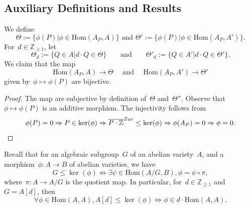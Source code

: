 \documentclass[12pt]{amsart}
\newcommand{\Hom}{\mbox{Hom}}
\newcommand{\Z}{{\mathbb Z}}
\newcommand{\ol}{\overline}
\begin{document}
\subsection{Auxiliary Definitions and Results}
We define
\[
\Theta:=\{\phi(P)|\phi\in \Hom(A_P,A)\}\text{ and }
\Theta':=\{\phi(P)|\phi\in \Hom(A_P,A')\}.
\]
For~$d\in\Z_{\geq1}$, let
\[
\Theta_d:=\{Q\in A|d\cdot Q\in \Theta\}\qquad\text{and}\qquad
\Theta'_d:=\{Q\in A'|d\cdot Q\in \Theta'\}.
\]
We claim that the map
\[
\Hom(A_P,A)\to \Theta\quad\text{ and }
\quad \Hom(A_P,A')\to \Theta'
\]
given by~$\phi\mapsto\phi(P)$ are bijective.
\begin{proof}The map are subjective by definition of~$\Theta$ and~$\Theta''$. Observe that~$\phi\mapsto \phi(P)$ is an additive morphism. The injectivity follows from
\[
\phi(P)=0\Rightarrow P\in \ker(\phi)\Rightarrow \ol{P\cdot \Z}^{Zar}\leq \ker(\phi)\Rightarrow \phi(A_P)=0\Rightarrow \phi=0.
\qedhere\]
\end{proof}
Recall that for an algebraic subgroup~$G$ of an abelian variety~$A$, and a morphism~$\phi:A\to B$ of abelian varieties, we have
\[
G\leq \ker(\phi)\Leftrightarrow \exists \psi\in \Hom(A/G,B), \phi=\psi\circ \pi,
\]
where~$\pi:A\to A/G$ is the quotient map. In particular, for~$d\in\Z_{\geq1}$ and~$G=A[d]$, 
then
\begin{equation}\label{eq:lift kernel isogeny}
\forall \phi\in\Hom(A,A), A[d]\leq \ker(\phi)\Leftrightarrow \phi\in d\cdot \Hom(A,A).
\end{equation}
\end{document}
